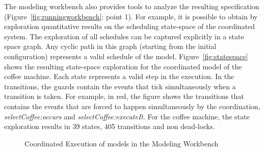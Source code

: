 The modeling workbench also provides tools to analyze the resulting \ccsl specification (Figure~\ref{fig:runningworkbench}: point 1). For example, it is possible to obtain by exploration quantitative results on the scheduling state-space of the coordinated system. The exploration of all schedules can be captured explicitly in a state space graph. Any cyclic path in this graph (starting from the initial configuration) represents a valid schedule of the model. Figure~\ref{fig:statespace} shows the resulting state-space exploration for the coordinated model of the coffee machine. Each state represents a valid step in the execution. In the transitions, the guards contain the events that tick simultaneously when a transition is taken. For example, in red, the figure shows the transitions that contains the events that are forced to happen simultaneously by the coordination, \eg \emph{selectCoffee:occurs} and \emph{selectCoffee:executeIt}. For the coffee machine, the state exploration results in 39 states, 405 transitions and non dead-locks.    


\begin{figure}[h]
	\centering
	\caption{Coordinated Execution of models in the Modeling Workbench}
	\label{fig:subfigureExample1}
\end{figure}

